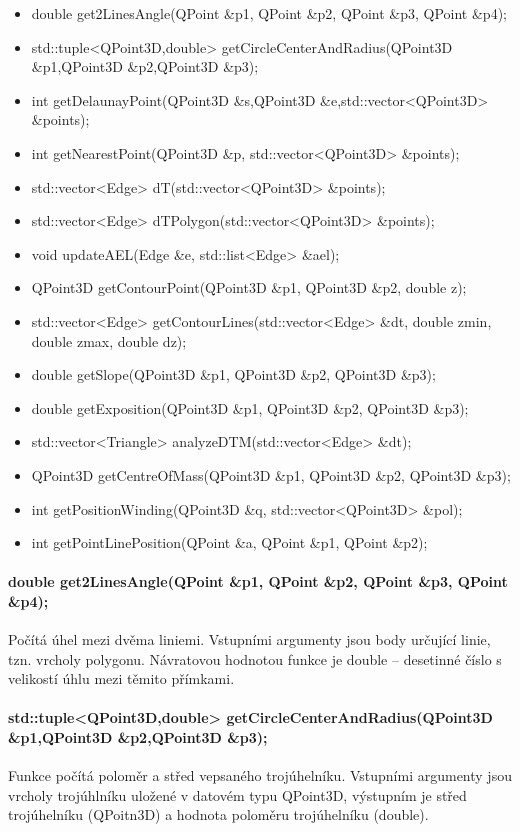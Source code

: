 \documentclass[11pt]{article}
\begin{document}
\begin{itemize}
	\item double get2LinesAngle(QPoint \&p1, QPoint \&p2, QPoint \&p3, QPoint \&p4);
	\item std::tuple<QPoint3D,double> getCircleCenterAndRadius(QPoint3D \&p1,QPoint3D \&p2,QPoint3D \&p3);
	\item int getDelaunayPoint(QPoint3D \&s,QPoint3D \&e,std::vector<QPoint3D> \&points);
	\item int getNearestPoint(QPoint3D \&p, std::vector<QPoint3D> \&points);
	\item std::vector<Edge> dT(std::vector<QPoint3D> \&points);
	\item std::vector<Edge> dTPolygon(std::vector<QPoint3D> \&points);
	\item void updateAEL(Edge \&e, std::list<Edge> \&ael);
	\item QPoint3D getContourPoint(QPoint3D \&p1, QPoint3D \&p2, double z);
	\item std::vector<Edge> getContourLines(std::vector<Edge> \&dt, double zmin, double zmax, double dz);
	\item double getSlope(QPoint3D \&p1, QPoint3D \&p2, QPoint3D \&p3);
	\item double getExposition(QPoint3D \&p1, QPoint3D \&p2, QPoint3D \&p3);
	\item std::vector<Triangle> analyzeDTM(std::vector<Edge> \&dt);
	\item QPoint3D getCentreOfMass(QPoint3D \&p1, QPoint3D \&p2, QPoint3D \&p3);
	\item int getPositionWinding(QPoint3D \&q, std::vector<QPoint3D> \&pol);
	\item int getPointLinePosition(QPoint \&a, QPoint \&p1, QPoint \&p2);
\end{itemize}


\paragraph{double get2LinesAngle(QPoint \&p1, QPoint \&p2, QPoint \&p3, QPoint \&p4);}
Počítá úhel mezi dvěma liniemi. Vstupními argumenty jsou body určující linie, tzn. vrcholy polygonu. Návratovou hodnotou funkce je double – desetinné číslo s velikostí úhlu mezi těmito přímkami.  

\paragraph{std::tuple<QPoint3D,double> getCircleCenterAndRadius(QPoint3D \&p1,QPoint3D \&p2,QPoint3D \&p3);}
Funkce počítá poloměr a střed vepsaného trojúhelníku. Vstupními argumenty jsou vrcholy trojúhlníku uložené v datovém typu QPoint3D, výstupním je střed trojúhelníku (QPoitn3D) a hodnota poloměru trojúhelníku (double).
\end{document}
